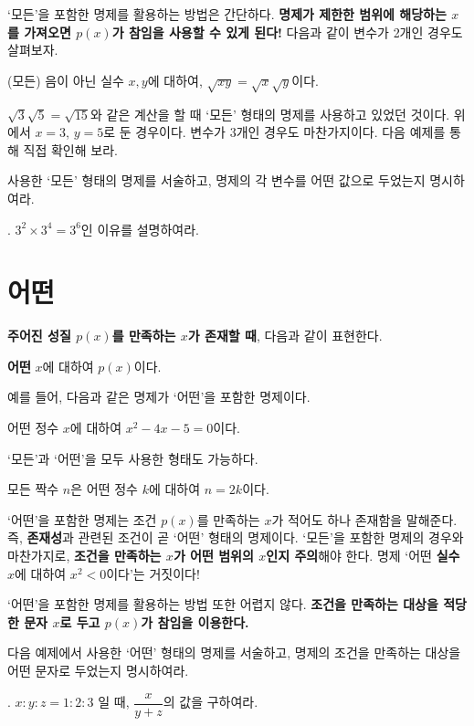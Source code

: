 `모든'을 포함한 명제를 활용하는 방법은 간단하다. \textbf{명제가 제한한 범위에 해당하는 \(x\)를 가져오면 \(p(x)\)가 참임을 사용할 수 있게 된다!} 다음과 같이 변수가 2개인 경우도 살펴보자.
\begin{center}
    (모든) 음이 아닌 실수 \(x, y\)에 대하여, \(\sqrt{xy} = \sqrt{x}\sqrt{y}\)이다.
\end{center}
\(\sqrt{3}\sqrt{5} = \sqrt{15}\)와 같은 계산을 할 때 `모든' 형태의 명제를 사용하고 있었던 것이다. 위에서 \(x = 3\), \(y = 5\)로 둔 경우이다. 변수가 3개인 경우도 마찬가지이다. 다음 예제를 통해 직접 확인해 보라.

사용한 `모든' 형태의 명제를 서술하고, 명제의 각 변수를 어떤 값으로 두었는지 명시하여라.

\bigskip

\ex. \(3^2 \times 3^4 = 3^6\)인 이유를 설명하여라.

\pagebreak

\section{어떤}

\textbf{주어진 성질 \(p(x)\)를 만족하는 \(x\)가 존재할 때}, 다음과 같이 표현한다.
\begin{center}
    \textbf{어떤} \(x\)에 대하여 \(p(x)\)이다.
\end{center}
예를 들어, 다음과 같은 명제가 `어떤'을 포함한 명제이다.
\begin{center}
    어떤 정수 \(x\)에 대하여 \(x^2 - 4x - 5 = 0\)이다.
\end{center}
`모든'과 `어떤'을 모두 사용한 형태도 가능하다.
\begin{center}
    모든 짝수 \(n\)은 어떤 정수 \(k\)에 대하여 \(n = 2k\)이다.
\end{center}

`어떤'을 포함한 명제는 조건 \(p(x)\)를 만족하는 \(x\)가 적어도 하나 존재함을 말해준다. 즉, \textbf{존재성}과 관련된 조건이 곧 `어떤' 형태의 명제이다. `모든'을 포함한 명제의 경우와 마찬가지로, \textbf{조건을 만족하는 \(x\)가 어떤 범위의 \(x\)인지 주의}해야 한다. 명제 `어떤 \textbf{실수} \(x\)에 대하여 \(x^2 < 0\)이다'는 거짓이다!

`어떤'을 포함한 명제를 활용하는 방법 또한 어렵지 않다. \textbf{조건을 만족하는 대상을 적당한 문자 \(x\)로 두고 \(p(x)\)가 참임을 이용한다.}

다음 예제에서 사용한 `어떤' 형태의 명제를 서술하고, 명제의 조건을 만족하는 대상을 어떤 문자로 두었는지 명시하여라.

\bigskip

\ex. \(x : y : z = 1 : 2 : 3\) 일 때, \(\dfrac{x}{y + z}\)의 값을 구하여라.

\pagebreak
